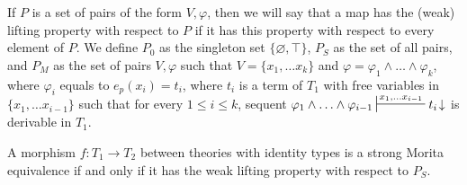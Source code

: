 \documentclass[reqno]{amsart}
\theoremstyle{definition}
\theoremstyle{remark}
\numberwithin{figure}{section}
\begin{document}
If $P$ is a set of pairs of the form $V,\varphi$, then we will say that a map has the (weak) lifting property with respect to $P$ if it has this property with respect to every element of $P$.
We define $P_0$ as the singleton set $\{ \varnothing,\top \}$, $P_S$ as the set of all pairs, and $P_M$ as the set of pairs $V,\varphi$ such that $V = \{ x_1, \ldots x_k \}$
and $\varphi = \varphi_1 \land \ldots \land \varphi_k$, where $\varphi_i$ equals to $e_p(x_i) = t_i$,
where $t_i$ is a term of $T_1$ with free variables in $\{ x_1, \ldots x_{i-1} \}$ such that for every $1 \leq i \leq k$,
sequent $\varphi_1 \land \ldots \land \varphi_{i-1} \sststile{}{x_1, \ldots x_{i-1}} t_i\!\downarrow$ is derivable in $T_1$.

\begin{prop}
A morphism $f : T_1 \to T_2$ between theories with identity types is a strong Morita equivalence if and only if it has the weak lifting property with respect to $P_S$.
\end{prop}
\end{document}

